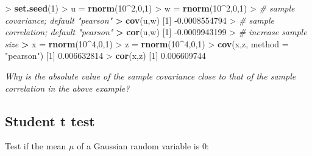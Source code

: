 \documentclass[]{article}
\newenvironment{Shaded}{\begin{snugshade}}{\end{snugshade}}
\newcommand{\KeywordTok}[1]{\textcolor[rgb]{0.13,0.29,0.53}{\textbf{{#1}}}}
\newcommand{\DataTypeTok}[1]{\textcolor[rgb]{0.13,0.29,0.53}{{#1}}}
\newcommand{\DecValTok}[1]{\textcolor[rgb]{0.00,0.00,0.81}{{#1}}}
\newcommand{\FloatTok}[1]{\textcolor[rgb]{0.00,0.00,0.81}{{#1}}}
\newcommand{\StringTok}[1]{\textcolor[rgb]{0.31,0.60,0.02}{{#1}}}
\newcommand{\CommentTok}[1]{\textcolor[rgb]{0.56,0.35,0.01}{\textit{{#1}}}}
\newcommand{\ErrorTok}[1]{\textcolor[rgb]{0.64,0.00,0.00}{\textbf{{#1}}}}
\newcommand{\NormalTok}[1]{{#1}}
\begin{document}
\begin{Shaded}
\begin{Highlighting}[]
\NormalTok{>}\StringTok{ }\KeywordTok{set.seed}\NormalTok{(}\DecValTok{1}\NormalTok{)}
\NormalTok{>}\StringTok{ }\NormalTok{u =}\StringTok{ }\KeywordTok{rnorm}\NormalTok{(}\DecValTok{10}\NormalTok{^}\DecValTok{2}\NormalTok{,}\DecValTok{0}\NormalTok{,}\DecValTok{1}\NormalTok{)}
\NormalTok{>}\StringTok{ }\NormalTok{w =}\StringTok{ }\KeywordTok{rnorm}\NormalTok{(}\DecValTok{10}\NormalTok{^}\DecValTok{2}\NormalTok{,}\DecValTok{0}\NormalTok{,}\DecValTok{1}\NormalTok{)}
\NormalTok{>}\StringTok{ }\CommentTok{# sample covariance; default "pearson"}
\ErrorTok{>}\StringTok{ }\KeywordTok{cov}\NormalTok{(u,w)}
\NormalTok{[}\DecValTok{1}\NormalTok{] -}\FloatTok{0.0008554794}
\NormalTok{>}\StringTok{ }\CommentTok{# sample correlation; default "pearson"}
\ErrorTok{>}\StringTok{ }\KeywordTok{cor}\NormalTok{(u,w)}
\NormalTok{[}\DecValTok{1}\NormalTok{] -}\FloatTok{0.0009943199}
\NormalTok{>}\StringTok{ }\CommentTok{# increase sample size}
\ErrorTok{>}\StringTok{ }\NormalTok{x =}\StringTok{ }\KeywordTok{rnorm}\NormalTok{(}\DecValTok{10}\NormalTok{^}\DecValTok{4}\NormalTok{,}\DecValTok{0}\NormalTok{,}\DecValTok{1}\NormalTok{)}
\NormalTok{>}\StringTok{ }\NormalTok{z =}\StringTok{ }\KeywordTok{rnorm}\NormalTok{(}\DecValTok{10}\NormalTok{^}\DecValTok{4}\NormalTok{,}\DecValTok{0}\NormalTok{,}\DecValTok{1}\NormalTok{)}
\NormalTok{>}\StringTok{ }\KeywordTok{cov}\NormalTok{(x,z, }\DataTypeTok{method =} \StringTok{"pearson"}\NormalTok{)}
\NormalTok{[}\DecValTok{1}\NormalTok{] }\FloatTok{0.006632814}
\NormalTok{>}\StringTok{ }\KeywordTok{cor}\NormalTok{(x,z)}
\NormalTok{[}\DecValTok{1}\NormalTok{] }\FloatTok{0.006609744}
\end{Highlighting}
\end{Shaded}

\emph{Why is the absolute value of the sample covariance close to that
of the sample correlation in the above example?}

\subsection{Student t test}\label{student-t-test}

Test if the mean \(\mu\) of a Gaussian random variable is \(0\):
\end{document}
